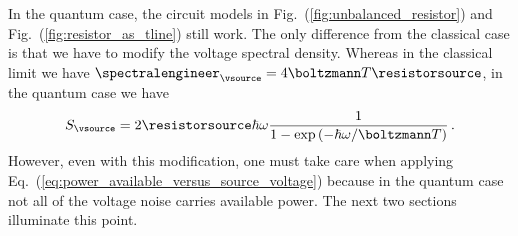 
In the quantum case, the circuit models in Fig.~(\ref{fig:unbalanced_resistor}) and Fig.~(\ref{fig:resistor_as_tline}) still work.
The only difference from the classical case is that we have to modify the voltage spectral density.
Whereas in the classical limit we have $\spectralengineer_{\vsource} = 4 \boltzmann T \resistorsource$, in the quantum case we have
\begin{equation}
  S_{\vsource} = 2 \resistorsource \hbar \omega \frac{1}{1 - \exp \left(-\hbar \omega / \boltzmann T \right)}
  \, .
\end{equation}
However, even with this modification, one must take care when applying Eq.~(\ref{eq:power_available_versus_source_voltage}) because in the quantum case not all of the voltage noise carries available power.
The next two sections illuminate this point.

